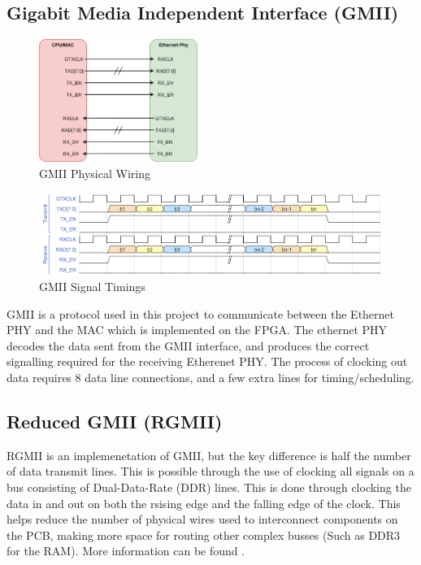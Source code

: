 \subsection{Gigabit Media Independent Interface (GMII)}

\begin{figure}[H]
    \begin{center}
        \includegraphics[keepaspectratio,height=4cm]{Images/GMIIWiring}
        \caption{GMII Physical Wiring}
        \label{fig:gmiiwiring}
    \end{center}
\end{figure}

\begin{figure}[H]
    \begin{center}
        \includegraphics[keepaspectratio,width=15cm]{Images/GMIISignaling}
        \caption{GMII Signal Timings}
        \label{fig:gmiisignals}
    \end{center}
\end{figure}

\par GMII is a protocol used in this project to communicate between the Ethernet PHY and the MAC which is implemented 
on the FPGA. The ethernet PHY decodes the data sent from the GMII interface, and produces the correct signalling 
required for the receiving Etherenet PHY. The process of clocking out data requires 8 data line connections, 
and a few extra lines for timing/scheduling.

\subsection{Reduced GMII (RGMII)}

\par RGMII is an implemenetation of GMII, but the key difference is half the number of data transmit lines. This is
possible through the use of clocking all signals on a bus consisting of Dual-Data-Rate (DDR) lines. This is done 
through clocking the data in and out on both the rsising edge and the falling edge of the clock. This helps reduce 
the number of physical wires used to interconnect components on the PCB, making more space for routing other complex 
busses (Such as DDR3 for the RAM). More information can be found \cite{RGMIISpec}.

